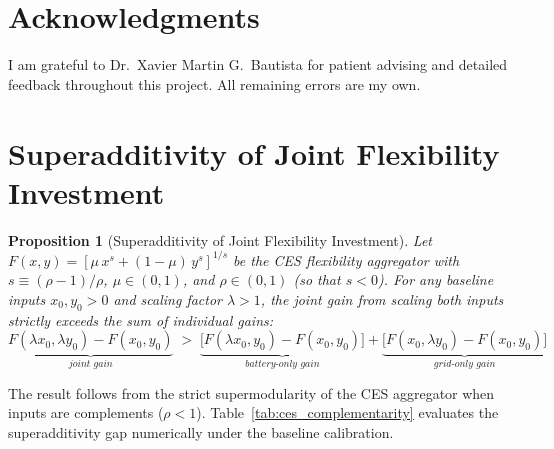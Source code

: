 \documentclass[12pt, a4paper]{article}
\newtheorem{proposition}{Proposition}
\begin{document}
	\section*{Acknowledgments}
	
	I am grateful to Dr.\ Xavier Martin G.\ Bautista for patient advising and detailed feedback throughout this project. All remaining errors are my own.
	
	
	
	
	\appendix

	\section{Superadditivity of Joint Flexibility Investment} \label{app:proof_superadditivity}

	\begin{proposition}[Superadditivity of Joint Flexibility Investment] \label{prop:superadditivity}
		Let $F(x, y) = [\mu \, x^{s} + (1-\mu) \, y^{s}]^{1/s}$ be the CES flexibility aggregator with $s \equiv (\rho - 1)/\rho$, $\mu \in (0,1)$, and $\rho \in (0,1)$ (so that $s < 0$). For any baseline inputs $x_0, y_0 > 0$ and scaling factor $\lambda > 1$, the joint gain from scaling both inputs strictly exceeds the sum of individual gains:
		\begin{equation*}
			\underbrace{F(\lambda x_0, \lambda y_0) - F(x_0, y_0)}_{\textit{joint gain}} \;>\; \underbrace{\bigl[F(\lambda x_0, y_0) - F(x_0, y_0)\bigr]}_{\textit{battery-only gain}} + \underbrace{\bigl[F(x_0, \lambda y_0) - F(x_0, y_0)\bigr]}_{\textit{grid-only gain}}
		\end{equation*}
	\end{proposition}

	\noindent The result follows from the strict supermodularity of the CES aggregator when inputs are complements ($\rho < 1$). Table~\ref{tab:ces_complementarity} evaluates the superadditivity gap numerically under the baseline calibration.
\end{document}
